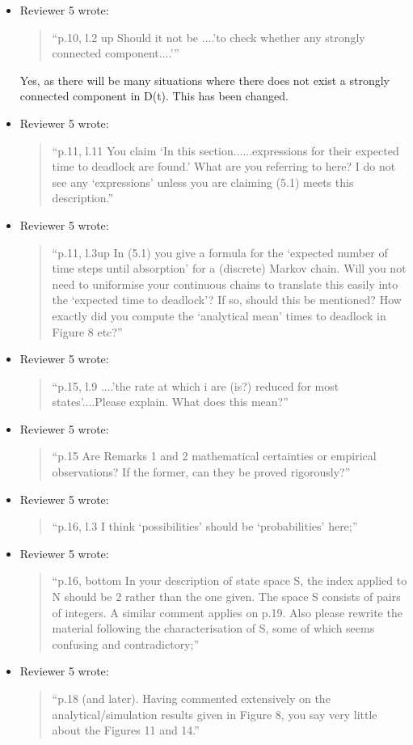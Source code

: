 \documentclass{article}
\begin{document}
\begin{itemize}
\item Reviewer 5 wrote:
\begin{quote}
``p.10, l.2 up Should it not be ....’to check whether any strongly connected component....’''
\end{quote}

Yes, as there will be many situations where there does not exist a strongly connected component in D(t). This has been changed.


\item Reviewer 5 wrote:
\begin{quote}
``p.11, l.11 You claim ‘In this section......expressions for their expected time to deadlock are found.’ What are you referring to here? I do not see any ‘expressions’ unless you are claiming (5.1) meets this description.''
\end{quote}


\item Reviewer 5 wrote:
\begin{quote}
``p.11, l.3up In (5.1) you give a formula for the ‘expected number of time steps until absorption’ for a (discrete) Markov chain. Will you not need to uniformise your continuous chains to translate this easily into the ‘expected time to deadlock’? If so, should this be mentioned? How exactly did you compute the ‘analytical mean’ times to deadlock in Figure 8 etc?''
\end{quote}

\item Reviewer 5 wrote:
\begin{quote}
``p.15, l.9 ....’the rate at which i are (is?) reduced for most states’....Please explain. What does this mean?''
\end{quote}

\item Reviewer 5 wrote:
\begin{quote}
``p.15 Are Remarks 1 and 2 mathematical certainties or empirical observations? If the former, can they be proved rigorously?''
\end{quote}

\item Reviewer 5 wrote:
\begin{quote}
``p.16, l.3 I think ‘possibilities’ should be ‘probabilities’ here;''
\end{quote}


\item Reviewer 5 wrote:
\begin{quote}
``p.16, bottom In your description of state space S, the index applied to N should be 2 rather than the one given. The space S consists of pairs of integers. A similar comment applies on p.19. Also please rewrite the material following the characterisation of S, some of which seems confusing and contradictory;''
\end{quote}


\item Reviewer 5 wrote:
\begin{quote}
``p.18 (and later). Having commented extensively on the analytical/simulation results given in Figure 8, you say very little about the Figures 11 and 14.''
\end{quote}


\end{itemize}
\end{document}
